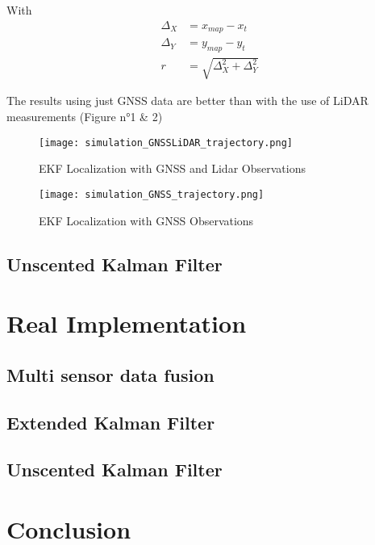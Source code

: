\documentclass[conference]{IEEEtran}
\begin{document}
With 
\begin{align*}
    \Delta_X &= x_{map} - x_t \\ 
    \Delta_Y &= y_{map} - y_t \\ 
    r &= \sqrt{\Delta_X^2 + \Delta_Y^2}
\end{align*}

The results using just GNSS data are better than with the use of LiDAR measurements (Figure n°1 \& 2)

\begin{figure}
    \centering
    \texttt{[image: simulation\_GNSSLiDAR\_trajectory.png]}
    \caption{EKF Localization with GNSS and Lidar Observations}
    \label{fig:enter-label}
\end{figure}

\begin{figure}
    \centering
    \texttt{[image: simulation\_GNSS\_trajectory.png]}
    \caption{EKF Localization with GNSS Observations}
    \label{fig:enter-label}
\end{figure}
\subsection{Unscented Kalman Filter}

\section{Real Implementation}

\subsection{Multi sensor data fusion}

\subsection{Extended Kalman Filter}

\subsection{Unscented Kalman Filter}

\section{Conclusion}
\end{document}
